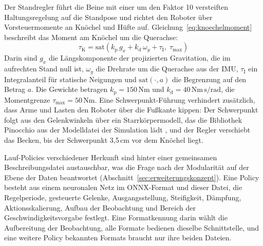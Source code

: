 Der Standregler führt die Beine mit einer um den Faktor 10 versteiften Haltungsregelung auf die Standpose und richtet den Roboter über Vorsteuermomente an Knöchel und Hüfte auf.
Gleichung~\ref{eq:knoechelmoment} beschreibt das Moment am Knöchel um die Querachse:
\begin{equation}
  \tau_\mathrm{K} = \mathrm{sat}\!\left( k_\mathrm{p}\, g_x + k_\mathrm{d}\, \omega_y + \tau_\mathrm{I},\; \tau_{\max} \right)
  \label{eq:knoechelmoment}
\end{equation}
Darin sind $g_x$ die Längskomponente der projizierten Gravitation, die im aufrechten Stand null ist, $\omega_y$ die Drehrate um die Querachse aus der IMU, $\tau_\mathrm{I}$ ein Integralanteil für statische Neigungen und $\mathrm{sat}(\cdot,a)$ die Begrenzung auf den Betrag $a$.
Die Gewichte betragen $k_\mathrm{p} = 150\,\mathrm{Nm}$ und $k_\mathrm{d} = 40\,\mathrm{Nm\,s/rad}$, die Momentgrenze $\tau_{\max} = 50\,\mathrm{Nm}$.
Eine Schwerpunkt-Führung verhindert zusätzlich, dass Arme und Lasten den Roboter über die Fußkante kippen: Der Schwerpunkt folgt aus den Gelenkwinkeln über ein Starrkörpermodell, das die Bibliothek Pinocchio \cite{Carpentier2019} aus der Modelldatei der Simulation lädt , und der Regler verschiebt das Becken, bis der Schwerpunkt 3,5\,cm vor dem Knöchel liegt.

Lauf-Policies verschiedener Herkunft sind hinter einer gemeinsamen Beschreibungsdatei austauschbar, was die Frage nach der Modularität auf der Ebene der Daten beantwortet (Abschnitt~\ref{sec:erweiterungskonzept}).
Eine Policy besteht aus einem neuronalen Netz im ONNX-Format \cite{UnitreeRLMjlab} und dieser Datei, die Regelperiode, gesteuerte Gelenke, Ausgangsstellung, Steifigkeit, Dämpfung, Aktionsskalierung, Aufbau der Beobachtung und Bereich der Geschwindigkeitsvorgabe festlegt.
Eine Formatkennung darin wählt die Aufbereitung der Beobachtung, alle Formate bedienen dieselbe Schnittstelle, und eine weitere Policy bekannten Formats braucht nur ihre beiden Dateien.

